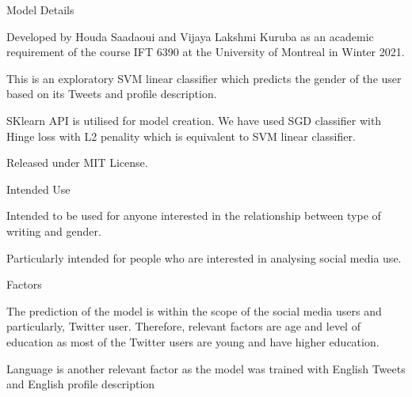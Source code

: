 \documentclass{article}
\begin{document}
 \begin{adjustwidth}{-60pt}{-30pt}
 \begin{singlespace}
 
 \begin{tcolorbox}[title=\textbf{Model Card - Tweeter Gender Classification },
     breakable, sharp corners, boxrule=0.7pt]
 
 \small{
 
 \begin{multicols}{2}
 \begin{mcsection}{Model Details}
     \item Developed by Houda Saadaoui and  Vijaya Lakshmi Kuruba as an academic requirement of the course IFT 6390 at the University of Montreal in Winter 2021.
     \item  This is an exploratory SVM linear classifier which predicts the gender of the user based on its Tweets and profile description.  
     \item SKlearn API is utilised for model creation. We have used SGD classifier with Hinge loss with L2 penality which is equivalent to SVM linear classifier.
     \item Released under MIT License.

 \end{mcsection}
 
 \begin{mcsection}{Intended Use}
     \item Intended to be used for anyone interested  in the relationship between type of writing and gender. 
     \item Particularly intended for people who are interested in analysing social media use.

 \end{mcsection}
 
 \begin{mcsection}{Factors}
     \item The prediction of the model is within the scope of the social media users and particularly, Twitter user. 
     Therefore, relevant factors are age and level of education as most of the Twitter users are young and have higher education.
    \item Language is another relevant factor as the model was trained with English Tweets and English profile description


\end{mcsection}
\end{multicols}}
\end{tcolorbox}
\end{singlespace}
\end{adjustwidth}
\end{document}
